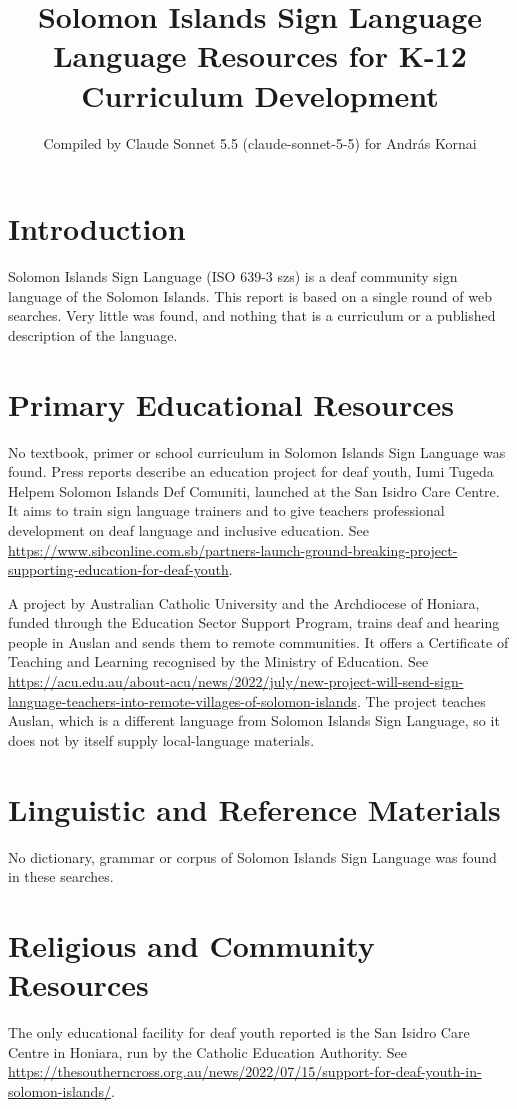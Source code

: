 \documentclass[12pt]{article}
\title{Solomon Islands Sign Language Language Resources for K-12 Curriculum Development}
\author{Compiled by Claude Sonnet 5.5 (claude-sonnet-5-5) for Andr\'as Kornai}
\date{}
\begin{document}
\maketitle

\section{Introduction}
Solomon Islands Sign Language (ISO 639-3 szs) is a deaf community sign language of the Solomon Islands. This report is based on a single round of web searches. Very little was found, and nothing that is a curriculum or a published description of the language.

\section{Primary Educational Resources}
No textbook, primer or school curriculum in Solomon Islands Sign Language was found. Press reports describe an education project for deaf youth, Iumi Tugeda Helpem Solomon Islands Def Comuniti, launched at the San Isidro Care Centre. It aims to train sign language trainers and to give teachers professional development on deaf language and inclusive education. See \url{https://www.sibconline.com.sb/partners-launch-ground-breaking-project-supporting-education-for-deaf-youth}.

A project by Australian Catholic University and the Archdiocese of Honiara, funded through the Education Sector Support Program, trains deaf and hearing people in Auslan and sends them to remote communities. It offers a Certificate of Teaching and Learning recognised by the Ministry of Education. See \url{https://acu.edu.au/about-acu/news/2022/july/new-project-will-send-sign-language-teachers-into-remote-villages-of-solomon-islands}. The project teaches Auslan, which is a different language from Solomon Islands Sign Language, so it does not by itself supply local-language materials.

\section{Linguistic and Reference Materials}
No dictionary, grammar or corpus of Solomon Islands Sign Language was found in these searches.

\section{Religious and Community Resources}
The only educational facility for deaf youth reported is the San Isidro Care Centre in Honiara, run by the Catholic Education Authority. See \url{https://thesoutherncross.org.au/news/2022/07/15/support-for-deaf-youth-in-solomon-islands/}.
\end{document}
